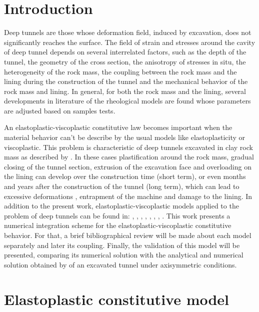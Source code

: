\documentclass[Journal,letterpaper]{ascelike-new}
\begin{document}
\section{Introduction}
Deep tunnels are those whose deformation field, induced by excavation, does not significantly reaches the surface. The field of strain and stresses around the cavity of deep tunnel depends on several interrelated factors, such as the depth of the tunnel, the geometry of the cross section, the anisotropy of stresses in situ, the heterogeneity of the rock mass, the coupling between the rock mass and the lining during the construction of the tunnel and the mechanical behavior of the rock mass and lining. In general, for both the rock mass and the lining, several developments in literature of the rheological models are found whose parameters are adjusted based on samples tests.

An elastoplastic-viscoplastic constitutive law becomes important when the material behavior can’t be describe by the usual models like elastoplasticity or viscoplastic. This problem is characteristic of deep tunnels excavated in clay rock mass as described by . In these cases plastification around the rock mass, gradual closing of the tunnel section, extrusion of the excavation face and overloading on the lining can develop over the construction time (short term), or even months and years after the construction of the tunnel (long term), which can lead to excessive deformations \cite{barla2008}, entrapment of the machine \cite{ramoni2010} and damage to the lining.
In addition to the present work, elastoplastic-viscoplastic models applied to the problem of deep tunnels can be found in: , , , , , , , .
This work presents a numerical integration scheme for the elastoplastic-viscoplastic constitutive behavior.
For that, a brief bibliographical review will be made about each model separately and later its coupling.
Finally, the validation of this model will be presented, comparing its numerical solution with the analytical and numerical solution obtained by  of an excavated tunnel under axisymmetric conditions.

\section{Elastoplastic constitutive model}
\end{document}
